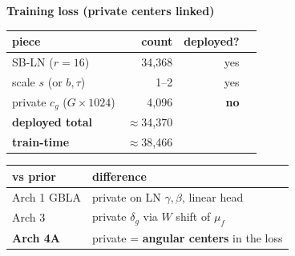\documentclass[11pt]{article}
\begin{document}
\vspace{4mm}
\begin{center}
{\normalsize\bfseries Training loss (private centers linked)}
\end{center}
\vspace{2mm}
\begin{center}
\end{center}

\vspace{4mm}
\begin{center}
\small
\begin{tabular}{L{55mm}rrr}
\toprule
piece & count & deployed? \\
\midrule
SB-LN ($r{=}16$) & 34{,}368 & yes \\
scale $s$ (or $b,\tau$) & 1--2 & yes \\
private $c_g$ ($G{\times}1024$) & 4{,}096 & \textbf{no} \\
\textbf{deployed total} & $\approx$34{,}370 & \\
\textbf{train-time} & $\approx$38{,}466 & \\
\bottomrule
\end{tabular}
\hspace{8mm}
\begin{tabular}{L{70mm}L{70mm}}
\toprule
vs prior & difference \\
\midrule
Arch 1 GBLA & private on LN $\gamma,\beta$, linear head \\
Arch 3 & private $\delta_g$ via $W$ shift of $\mu_f$ \\
\textbf{Arch 4A} & private = \textbf{angular centers} in the loss \\
\bottomrule
\end{tabular}
\end{center}
\end{document}
